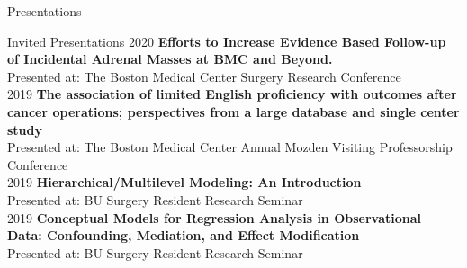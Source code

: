 \documentclass{resume} %
\begin{document}

\begin{rSection}{Presentations}
\printbibliography[]                  

\begin{refsection}[oral]
   \nocite{*}   
   \printbibliography[title={Podium}]
\end{refsection}

\printbibliography[]  
\begin{refsection}[poster]
   \nocite{*}   
   \printbibliography[title={Poster}]
\end{refsection}

\printbibliography[]  
\begin{refsection}[copresent]
   \nocite{*}   
   \printbibliography[title={Co-Authored}]
\end{refsection}


\end{rSection}




\begin{rSection}{Invited Presentations}
   2020 \enspace \textbf{Efforts to Increase Evidence Based Follow-up of Incidental Adrenal Masses at BMC and Beyond.
   }\\
   \hspace*{2mm}Presented at: The Boston Medical Center Surgery Research Conference\\
   2019 \enspace \textbf{The association of limited English proficiency with outcomes after cancer operations; perspectives from a large database and single center study}\\
   \hspace*{2mm}Presented at: The Boston Medical Center Annual Mozden Visiting Professorship Conference\\
   2019 \enspace \textbf{Hierarchical/Multilevel Modeling: An Introduction}\\
   \hspace*{2mm}Presented at: BU Surgery Resident Research Seminar\\
   2019 \enspace \textbf{Conceptual Models for Regression Analysis in Observational Data: Confounding, Mediation, and Effect Modification}\\
   \hspace*{2mm}Presented at: BU Surgery Resident Research Seminar  
   
   \end{rSection}
\end{document}
